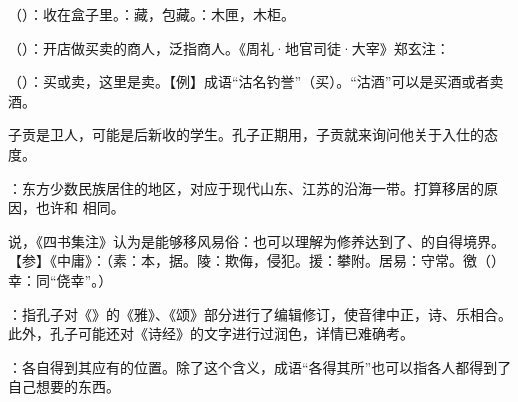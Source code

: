 {
\begin{lyitemize}
\item {}（）：收在盒子里。：藏，包藏。：木匣，木柜。
\item {}（）：开店做买卖的商人，泛指商人。《周礼·地官司徒·大宰》郑玄注：
\item {}（）：买或卖，这里是卖。【例】成语“沽名钓誉”（买）。“沽酒”可以是买酒或者卖酒。
\end{lyitemize}
子贡是卫人，可能是后新收的学生。孔子正期用，子贡就来询问他关于入仕的态度。
}
{}


{
\item {}：东方少数民族居住的地区，对应于现代山东、江苏的沿海一带。打算移居的原因，也许和  相同。
\item {}说，《四书集注》认为是能够移风易俗：也可以理解为修养达到了、的自得境界。【参】《中庸》：（素：本，据。陵：欺侮，侵犯。援：攀附。居易：守常。徼（）幸：同“侥幸”。）
}
{}


{
\item {}：指孔子对《》的《雅》、《颂》部分进行了编辑修订，使音律中正，诗、乐相合。此外，孔子可能还对《诗经》的文字进行过润色，详情已难确考。
\item {}：各自得到其应有的位置。除了这个含义，成语“各得其所”也可以指各人都得到了自己想要的东西。
}
{}



